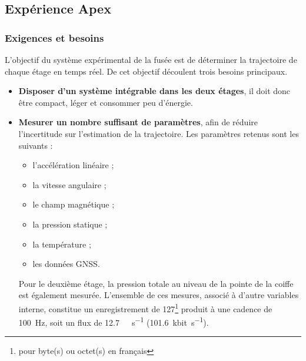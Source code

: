 \subsection{Expérience Apex}
\label{subsec:experience}

\subsubsection{Exigences et besoins}

L'objectif du système expérimental de la fusée est de déterminer la trajectoire de chaque étage en temps réel. De cet
objectif découlent trois besoins principaux.

\begin{itemize}
    \item \textbf{Disposer d'un système intégrable dans les deux étages}, il doit donc être compact, léger et consommer peu
    d'énergie.
    \item \textbf{Mesurer un nombre suffisant de paramètres}, afin de réduire l'incertitude sur l'estimation de la
    trajectoire. Les paramètres retenus sont les suivants :
    \begin{itemize}
        \item l'accélération linéaire ;
        \item la vitesse angulaire ;
        \item le champ magnétique ;
        \item la pression statique ;
        \item la température ;
        \item les données GNSS.
    \end{itemize}
    Pour le deuxième étage, la pression totale au niveau de la pointe de la coiffe est également mesurée. L'ensemble de ces
    mesures, associé à d'autre variables interne, constitue un enregistrement de \SI{127}{\byte}\footnote{\label{fn:byte}
    \SI{}{\byte} pour byte(s) ou octet(s) en français} produit à une cadence de \SI{100}{\hertz}, soit un flux de
    \SI{12.7}{\kilo\byte\per\second} (\SI{101.6}{\kilo bit\per\second}).\\


\end{itemize}
